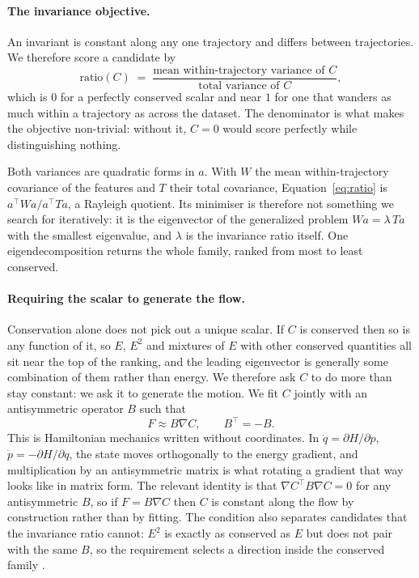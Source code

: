\paragraph{The invariance objective.} An invariant is constant along any one trajectory and differs
between trajectories. We therefore score a candidate by
\begin{equation}
\text{ratio}(C) \;=\;
\frac{\text{mean within-trajectory variance of } C}{\text{total variance of } C},
\label{eq:ratio}
\end{equation}
which is $0$ for a perfectly conserved scalar and near $1$ for one that wanders as much within a
trajectory as across the dataset. The denominator is what makes the objective non-trivial: without
it, $C = 0$ would score perfectly while distinguishing nothing.

Both variances are quadratic forms in $a$. With $W$ the mean within-trajectory covariance of the
features and $T$ their total covariance, Equation~\ref{eq:ratio} is $a^\top W a / a^\top T a$, a
Rayleigh quotient. Its minimiser is therefore not something we search for iteratively: it is the
eigenvector of the generalized problem $W a = \lambda\, T a$ with the smallest eigenvalue, and
$\lambda$ is the invariance ratio itself. One eigendecomposition returns the whole family, ranked
from most to least conserved.

\paragraph{Requiring the scalar to generate the flow.} Conservation alone does not pick out a unique
scalar. If $C$ is conserved then so is any function of it, so $E$, $E^2$ and mixtures of $E$ with
other conserved quantities all sit near the top of the ranking, and the leading eigenvector is
generally some combination of them rather than energy. We therefore ask $C$ to do more than stay
constant: we ask it to generate the motion. We fit $C$ jointly with an antisymmetric operator $B$
such that
\begin{equation}
F \approx B\nabla C, \qquad B^\top = -B.
\label{eq:pair}
\end{equation}
This is Hamiltonian mechanics written without coordinates. In $\dot q = \partial H/\partial p$,
$\dot p = -\partial H/\partial q$, the state moves orthogonally to the energy gradient, and
multiplication by an antisymmetric matrix is what rotating a gradient that way looks like in matrix
form. The relevant identity is that $\nabla C^\top B \nabla C = 0$ for any antisymmetric $B$, so if
$F = B\nabla C$ then $C$ is constant along the flow by construction rather than by fitting. The
condition also separates candidates that the invariance ratio cannot: $E^2$ is exactly as conserved
as $E$ but does not pair with the same $B$, so the requirement selects a direction inside the
conserved family \citep{arnold1989mathematical}.

